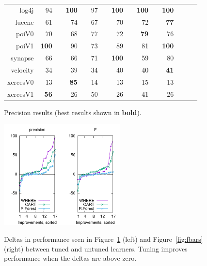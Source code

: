 \documentclass{sig-alternative}
\newcommand{\rone}{}
\newcommand{\rtwo}{}
\newcommand{\rthree}{}
\newcommand{\rfour}{}
\newcommand{\fig}[1]{Figure~\ref{fig:#1}}
\begin{document}
\begin{figure}[!t]
\begin{tabular}{r|rl|rl|rl|rl|rl|rlrl}
log4j & 94 &         & {\bf 100} & {\rfour} & 97 & {\rtwo} & {\bf 100} & {\rfour} & {\bf 100} & {\rfour} & {\bf 100 }& {\rfour}\\
lucene & 61 &         & 74 & {\rfour} & 67 & {\rone} & 70 & {\rtwo} & 72 & {\rthree} & {\bf 77} & {\rfour}\\
poiV0 & 70 &         & 68 &         & 77 & {\rfour} & 72 & {\rone} & {\bf 79} & {\rfour} & 76 & {\rthree}\\
poiV1 & {\bf  100} & {\rfour} & 90 & {\rthree} & 73 &         & 89 & {\rtwo} & 81 & {\rone} & {\bf 100} & {\rfour}\\
synapse & 66 &         & 66 &         & 71 & {\rone} & {\bf 100} & {\rfour} & 59 &         & 80 & {\rtwo}\\
velocity & 34 &         & 39 & {\rthree} & 34 &         & 40 & {\rfour} & 40 & {\rfour} & {\bf 41} & {\rfour}\\
xercesV0 & 13 &         & {\bf 85} & {\rfour} & 14 &         & 13 &         & 15 &         & 13 &        \\
xercesV1 & {\bf 56} & {\rfour} & 26 &         & 50 & {\rthree} & 26 &         & 41 & {\rtwo} & 26 &        \\
\end{tabular}
\caption{Precision results (best results  shown in {\bf bold}).}
\label{fig:precisionbars}
\end{figure}

\begin{figure}[!b]
\begin{center}
\includegraphics[width=1.25in]{precision1.pdf}\includegraphics[width=1.25in]{F1.pdf}
 \end{center}
\caption{Deltas in performance  seen in \fig{precisionbars} (left)
and \fig{fbars} (right) between tuned and untuned learners. Tuning improves performance when the deltas are above zero.}\label{fig:deltas}
 \end{figure}
\end{document}

